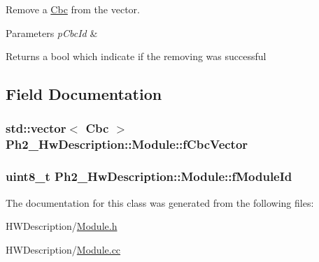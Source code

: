 Remove a \hyperlink{class_ph2___hw_description_1_1_cbc}{Cbc} from the vector. 


\begin{DoxyParams}{Parameters}
{\em p\-Cbc\-Id} & \\
\hline
\end{DoxyParams}
\begin{DoxyReturn}{Returns}
a bool which indicate if the removing was successful 
\end{DoxyReturn}


\subsection{Field Documentation}
\hypertarget{class_ph2___hw_description_1_1_module_ab5cfd93bf927592f609d31f66cd4161b}{
\subsubsection[{f\-Cbc\-Vector}]{\setlength{\rightskip}{0pt plus 5cm}std\-::vector$<$ {\bf Cbc} $>$ Ph2\-\_\-\-Hw\-Description\-::\-Module\-::f\-Cbc\-Vector\hspace{0.3cm}{\ttfamily [protected]}}}\label{class_ph2___hw_description_1_1_module_ab5cfd93bf927592f609d31f66cd4161b}
\hypertarget{class_ph2___hw_description_1_1_module_a8bf42ae708d304acbc5509edf7f7cee0}{
\subsubsection[{f\-Module\-Id}]{\setlength{\rightskip}{0pt plus 5cm}uint8\-\_\-t Ph2\-\_\-\-Hw\-Description\-::\-Module\-::f\-Module\-Id}}\label{class_ph2___hw_description_1_1_module_a8bf42ae708d304acbc5509edf7f7cee0}


The documentation for this class was generated from the following files\-:\begin{DoxyCompactItemize}
\item 
H\-W\-Description/\hyperlink{_module_8h}{Module.\-h}\item 
H\-W\-Description/\hyperlink{_module_8cc}{Module.\-cc}\end{DoxyCompactItemize}
